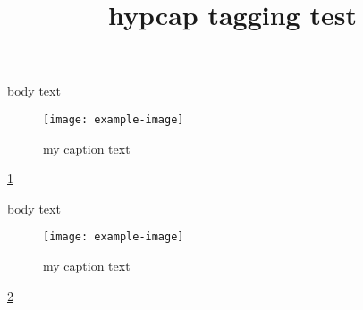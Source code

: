 \documentclass{article}
\title{hypcap tagging test}
\begin{document}
body text
\begin{figure}
\capstart
\texttt{[image: example-image]}
\caption{my caption text}
\label{fig}
\end{figure}

\ref{fig}

body text
\begin{figure}
\texttt{[image: example-image]}
\caption{my caption text}
\label{figB}
\end{figure}

\ref{figB}
\end{document}
